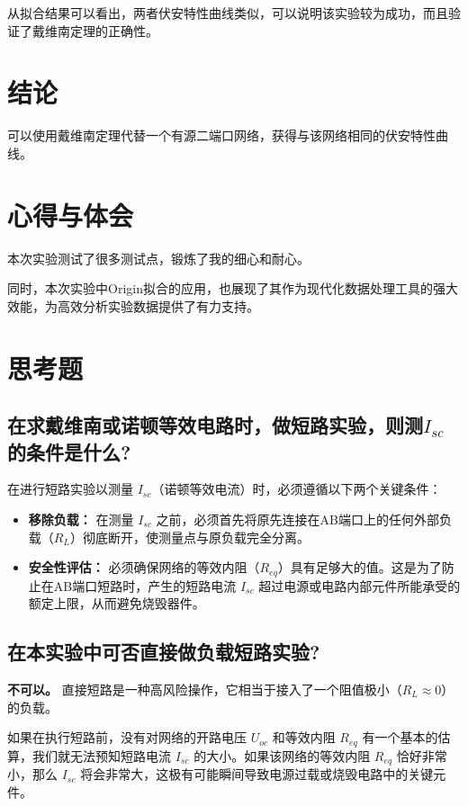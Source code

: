 \documentclass{Report} %
\begin{document}
    从拟合结果可以看出，两者伏安特性曲线类似，可以说明该实验较为成功，而且验证了戴维南定理的正确性。
\section{结论}
可以使用戴维南定理代替一个有源二端口网络，获得与该网络相同的伏安特性曲线。

\section{心得与体会}
本次实验测试了很多测试点，锻炼了我的细心和耐心。

同时，本次实验中Origin拟合的应用，也展现了其作为现代化数据处理工具的强大效能，为高效分析实验数据提供了有力支持。
\section{思考题}
\subsection{在求戴维南或诺顿等效电路时，做短路实验，则测$I_{sc}$的条件是什么?}

在进行短路实验以测量 $I_{sc}$（诺顿等效电流）时，必须遵循以下两个关键条件：

\begin{itemize}
    \item \textbf{移除负载：}
    在测量 $I_{sc}$ 之前，必须首先将原先连接在AB端口上的任何外部负载（$R_L$）彻底断开，使测量点与原负载完全分离。

    \item \textbf{安全性评估：}
    必须确保网络的等效内阻（$R_{eq}$）具有足够大的值。这是为了防止在AB端口短路时，产生的短路电流 $I_{sc}$ 超过电源或电路内部元件所能承受的额定上限，从而避免烧毁器件。
\end{itemize}


\subsection{在本实验中可否直接做负载短路实验?}
\textbf{不可以。}
直接短路是一种高风险操作，它相当于接入了一个阻值极小（$R_L \approx 0$）的负载。

如果在执行短路前，没有对网络的开路电压 $U_{oc}$ 和等效内阻 $R_{eq}$ 有一个基本的估算，我们就无法预知短路电流 $I_{sc}$ 的大小。如果该网络的等效内阻 $R_{eq}$ 恰好非常小，那么 $I_{sc}$ 将会非常大，这极有可能瞬间导致电源过载或烧毁电路中的关键元件。
\end{document}
